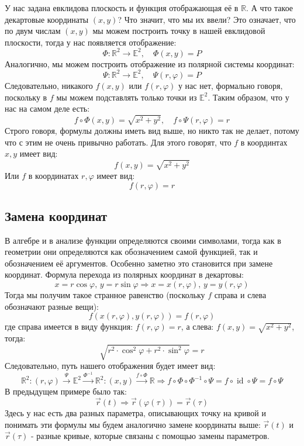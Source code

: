 \documentclass[12pt]{article}
\newcommand{\MR}{\mathbb{R}}
\newcommand{\MBE}{\mathbb{E}}
\theoremstyle{definition}
\DeclareMathOperator{\id}{\text{id}}
\begin{document}
У нас задана евклидова плоскость и функция отображающая её в $\MR$. А что такое декартовые координаты $(x,y)$? Что значит, что мы их ввели? Это означает, что по двум числам $(x,y)$ мы можем построить точку в нашей евклидовой плоскости, тогда у нас появляется отображение:
$$
	\Phi \colon \MR^2 \to \MBE^2, \quad \Phi(x,y) = P
$$
Аналогично, мы можем построить отображение из полярной системы координат:
$$
	\Psi \colon \MR^2 \to \MBE^2, \quad \Psi(r,\varphi) = P
$$
Следовательно, никакого $f(x,y)$ или $f(r,\varphi)$ у нас нет, формально говоря, поскольку в $f$ мы можем подставлять только точки из $\MBE^2$. Таким образом, что у нас на самом деле есть:
$$
	f \circ \Phi (x,y) = \sqrt{x^2 + y^2}, \quad f \circ \Psi (r,\varphi) = r
$$
Строго говоря, формулы должны иметь вид выше, но никто так не делает, потому что с этим не очень привычно работать. Для этого говорят, что $f$ в координтах $x,y$ имеет вид: 
$$
	f(x,y) = \sqrt{x^2 + y^2}
$$
Или $f$ в координатах $r,\varphi$ имеет вид:
$$
	f(r,\varphi) = r
$$
\subsection*{Замена координат}
В алгебре и в анализе функции определяются своими символами, тогда как в геометрии они определяются как обозначением самой функцией, так и обозначением её аргументов. Особенно заметно это становится при замене координат. Формула перехода из полярных координат в декартовы:
$$
	x = r\cos{\varphi}, \, y = r\sin{\varphi} \Rightarrow x = x(r,\varphi), \, y = y(r,\varphi)
$$
Тогда мы получим такое странное равенство (поскольку $f$ справа и слева обозначают разные вещи):
$$
	f(x(r,\varphi),y(r,\varphi)) = f(r,\varphi)
$$
где справа имеется в виду функция: $f(r,\varphi) = r$, а слева: $f(x,y) = \sqrt{x^2 + y^2}$, тогда:
$$
	\sqrt{r^2{\cdot}\cos^2{\varphi} + r^2{\cdot}\sin^2{\varphi}} = r
$$
Следовательно, путь нашего отображения будет имеет вид:
$$
	\MR^2\colon (r,\varphi) \xrightarrow{\Psi}\MBE^2 \xrightarrow{\Phi^{-1}} \MR^2 \colon (x,y) \xrightarrow{f\circ \Phi} \MR \Rightarrow f\circ \Phi \circ \Phi^{-1}\circ \Psi = f \circ \id \circ \Psi = f\circ \Psi
$$
В предыдущем примере было так:
$$
	\vec{r}(t) \Rightarrow \vec{r}(\varphi(\tau)) = \vec{r}(\tau)
$$
Здесь у нас есть два разных параметра, описывающих точку на кривой и понимать эти формулы мы будем аналогично замене координаты выше: $\vec{r}(t)$ и $\vec{r}(\tau)$ - разные кривые, которые связаны с помощью замены параметров.
\end{document}
